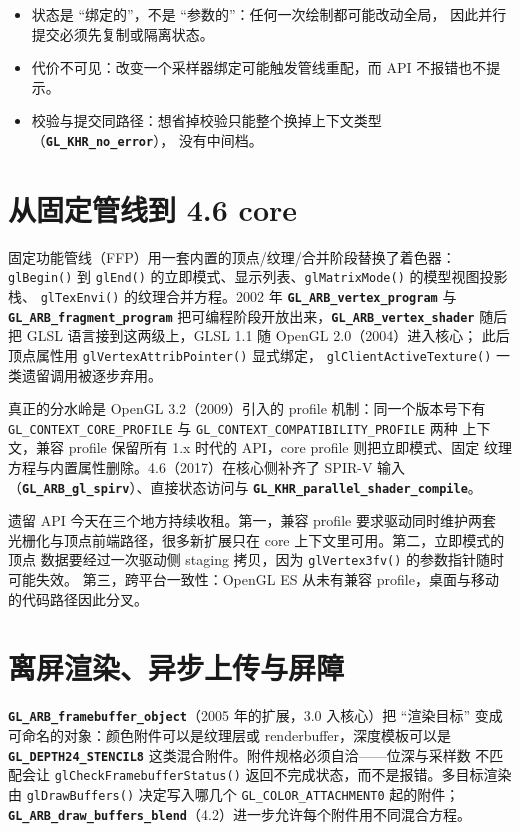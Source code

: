 \documentclass[12pt,a4paper,fontset=fandol]{ctexbook}
\newcommand{\Fn}[1]{\texttt{#1()}}
\newcommand{\Tp}[1]{\texttt{#1}}
\newcommand{\Bk}{\discretionary{}{}{}}
\newcommand{\Lib}[1]{\textbf{\texttt{#1}}}
\newcommand{\Lang}[1]{\textsf{#1}}
\newcommand{\GSL}{\Lang{GLSL}}
\newcommand{\SPIV}{\Lang{SPIR-V}}
\begin{document}
\begin{guideline}[title={状态机的三条硬约束}]
\begin{itemize}
\item 状态是 ``绑定的''，不是 ``参数的''：任何一次绘制都可能改动全局，
因此并行提交必须先复制或隔离状态。
\item 代价不可见：改变一个采样器绑定可能触发管线重配，而 API 不报错也不提示。
\item 校验与提交同路径：想省掉校验只能整个换掉上下文类型（\Lib{GL\_KHR\_no\_error}），
没有中间档。
\end{itemize}
\end{guideline}

\section{从固定管线到 4.6 core}

固定功能管线（FFP）用一套内置的顶点/纹理/合并阶段替换了着色器：\Fn{glBegin} 到
\Fn{glEnd} 的立即模式、显示列表、\Fn{glMatrixMode} 的模型视图投影栈、
\Fn{glTexEnvi} 的纹理合并方程。2002 年 \Lib{GL\_ARB\_vertex\_program} 与
\Lib{GL\_ARB\_fragment\_program} 把可编程阶段开放出来，\Lib{GL\_ARB\_vertex\_shader}
随后把 \GSL{} 语言接到这两级上，\GSL{} 1.1 随 OpenGL 2.0（2004）进入核心；
此后顶点属性用 \Fn{glVertexAttribPointer} 显式绑定，
\Fn{glClientActiveTexture} 一类遗留调用被逐步弃用。

真正的分水岭是 OpenGL 3.2（2009）引入的 profile 机制：同一个版本号下有
\Tp{GL\_CONTEXT\_CORE\_PROFILE} 与 \Tp{GL\_CONTEXT\_COMPATIBILITY\_PROFILE} 两种
上下文，兼容 profile 保留所有 1.x 时代的 API，core profile 则把立即模式、固定
纹理方程与内置属性删除。4.6（2017）在核心侧补齐了 \SPIV{} 输入
（\Lib{GL\_ARB\_gl\_spirv}）、直接状态访问与
\Lib{GL\_KHR\_parallel\_shader\_compile}。

遗留 API 今天在三个地方持续收租。第一，兼容 profile 要求驱动同时维护两套
光栅化与顶点前端路径，很多新扩展只在 core 上下文里可用。第二，立即模式的顶点
数据要经过一次驱动侧 staging 拷贝，因为 \Fn{glVertex3fv} 的参数指针随时可能失效。
第三，跨平台一致性：OpenGL ES 从未有兼容 profile，桌面与移动的代码路径因此分叉。

\section{离屏渲染、异步上传与屏障}

\Lib{GL\_{\Bk}ARB\_{\Bk}framebuffer\_{\Bk}object}（2005 年的扩展，3.0 入核心）把 ``渲染目标''
变成可命名的对象：颜色附件可以是纹理层或 renderbuffer，深度模板可以是
\Lib{GL\_{\Bk}DEPTH24\_{\Bk}STENCIL8} 这类混合附件。附件规格必须自洽------位深与采样数
不匹配会让 \Fn{gl{\Bk}Check{\Bk}Framebuffer{\Bk}Status} 返回不完成状态，而不是报错。多目标渲染
由 \Fn{gl{\Bk}Draw{\Bk}Buffers} 决定写入哪几个 \Tp{GL\_{\Bk}COLOR\_{\Bk}ATTACHMENT0} 起的附件；
\Lib{GL\_{\Bk}ARB\_{\Bk}draw\_{\Bk}buffers\_{\Bk}blend}（4.2）进一步允许每个附件用不同混合方程。
\end{document}
